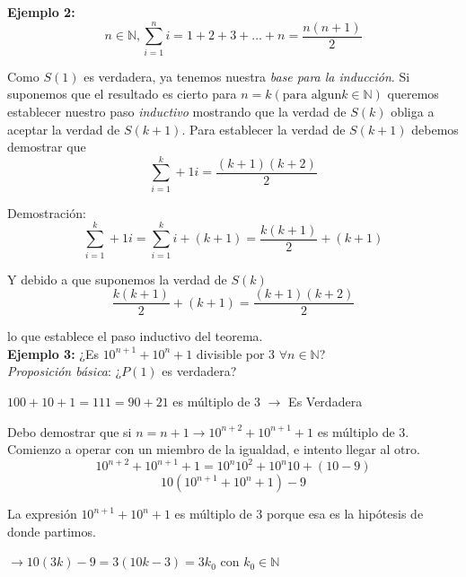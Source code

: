 \documentclass[a4paper, twoside]{article}
\begin{document}
\textbf{Ejemplo 2:}
\begin{equation*}
	n \in \mathbb{N}, \sum\limits_{i=1}^n i = 1 + 2 + 3 + \dots + n = \frac{n(n+1)}{2}
\end{equation*}

Como $S(1)$ es verdadera, ya tenemos nuestra \emph{base para la inducción}. Si suponemos que el resultado es cierto para
$n=k (\text{para algun} k \in \mathbb{N})$ queremos establecer nuestro paso \emph{inductivo} mostrando que la verdad de $S(k)$ 
obliga a aceptar la verdad de $S(k+1)$.
Para establecer la verdad de $S(k+1)$ debemos demostrar que
\begin{equation*}
	\sum\limits_{i=1}^k+1 i = \frac{(k+1)(k+2)}{2}
\end{equation*}

Demostración:
\begin{equation*}
	\sum\limits_{i=1}^k+1 i = \sum\limits_{i=1}^k i + (k+1) = \frac{k(k+1)}{2} + (k+1)
\end{equation*}

Y debido a que suponemos la verdad de $S(k)$
\begin{equation*}
	\frac{k(k+1)}{2} + (k+1) = \frac{(k+1)(k+2)}{2}
\end{equation*}

lo que establece el paso inductivo del teorema.\\

\textbf{Ejemplo 3:}
¿Es $10^{n+1}+10^{n}+1$ divisible por 3 $\forall n \in \mathbb{N}$?\\

\emph{Proposición básica}: ¿$P(1)$ es verdadera?
\begin{center}
	$100+10+1=111=90+21 $ es múltiplo de 3 $\rightarrow$ Es Verdadera
\end{center}

Debo demostrar que si $n=n+1 \rightarrow 10^{n+2}+10^{n+1}+1$ es múltiplo de 3.\\

Comienzo a operar con un miembro de la igualdad, e intento llegar al otro.
\begin{equation*}
	10^{n+2}+10^{n+1}+1=10^{n}10^{2}+10^{n}10+(10-9)
\end{equation*}
\begin{equation*}
	10(10^{n+1}+10^{n}+1)-9
\end{equation*}

La expresión $10^{n+1}+10^{n}+1$ es múltiplo de 3 porque esa es la hipótesis de donde partimos.

$\rightarrow 10 (3k) - 9 = 3 (10k -3) = 3k_0$ con $k_0 \in \mathbb{N}$
\end{document}
